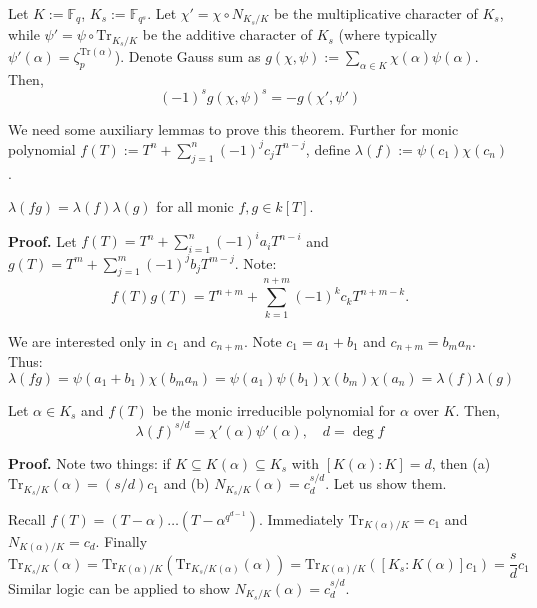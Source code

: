 \documentclass{template}
\begin{document}
\begin{theorem}
    Let $K := \mathbb{F}_q$, $K_s := \mathbb{F}_{q^s}$. Let $\chi' = \chi \circ
    N_{K_s/K}$ be the multiplicative character of $K_s$, while $\psi' = \psi
    \circ \text{Tr}_{K_s/K}$ be the additive character of $K_s$ (where typically
    $\psi'(\alpha) = \zeta_p^{\text{Tr}(\alpha)}$). Denote Gauss sum as
    $g(\chi,\psi) := \sum_{\alpha \in K} \chi(\alpha)\psi(\alpha)$. Then,
    \begin{equation*}
        (-1)^sg(\chi,\psi)^s = -g(\chi',\psi')
    \end{equation*}
\end{theorem}

We need some auxiliary lemmas to prove this theorem. Further for monic
polynomial $f(T) := T^n + \sum_{j=1}^n (-1)^jc_jT^{n-j}$, define $\lambda(f) :=
\psi(c_1)\chi(c_n)$.

\begin{lemma}
    $\lambda(fg) = \lambda(f)\lambda(g)$ for all monic $f,g \in k[T]$.
\end{lemma}

\textbf{Proof.} Let $f(T) = T^n + \sum_{i=1}^n (-1)^ia_iT^{n-i}$ and 
$g(T) = T^m + \sum_{j=1}^m (-1)^jb_jT^{m-j}$. Note:
\begin{equation*}
    f(T)g(T) = T^{n+m} + \sum_{k=1}^{n+m} (-1)^k c_k T^{n+m-k}.
\end{equation*}

We are interested only in $c_1$ and $c_{n+m}$. Note $c_1 = a_1 + b_1$ and
$c_{n+m} = b_ma_n$. Thus:
\begin{equation*}
    \lambda(fg) = \psi(a_1+b_1)\chi(b_ma_n) = \psi(a_1)\psi(b_1)\chi(b_m)\chi(a_n) = \lambda(f)\lambda(g)
\end{equation*}

\begin{lemma}
    Let $\alpha \in K_s$ and $f(T)$ be the monic irreducible polynomial for
    $\alpha$ over $K$. Then,
    \begin{equation*}
        \lambda(f)^{s/d} = \chi'(\alpha)\psi'(\alpha), \quad d = \deg f
    \end{equation*}
\end{lemma}

\textbf{Proof.} Note two things: if $K \subseteq K(\alpha) \subseteq K_s$ with
$[K(\alpha):K]=d$, then (a) $\text{Tr}_{K_s/K}(\alpha) = (s/d)c_1$ and (b)
$N_{K_s/K}(\alpha) = c_d^{s/d}$. Let us show them.

Recall $f(T) = (T-\alpha)\dots (T-\alpha^{q^{d-1}})$. Immediately
$\text{Tr}_{K(\alpha)/K} = c_1$ and $N_{K(\alpha)/K} = c_d$.
Finally 
\begin{equation*}
    \text{Tr}_{K_s/K}(\alpha) = \text{Tr}_{K(\alpha)/K}(\text{Tr}_{K_s/K(\alpha)}(\alpha)) = \text{Tr}_{K(\alpha)/K}([K_s:K(\alpha)]c_1) = \frac{s}{d}c_1
\end{equation*}
Similar logic can be applied to show $N_{K_s/K}(\alpha) = c_d^{s/d}$.
\end{document}
